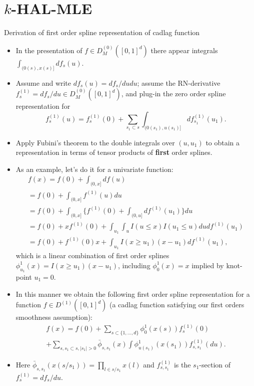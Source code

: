 \documentclass[t]{beamer}
\newlength{\wideitemsep}
\let\olditem\item
\renewcommand{\item}{\setlength{\itemsep}{\wideitemsep}\olditem}
\begin{document}
\section{$k$-HAL-MLE}
\begin{frame}{Derivation of first order spline representation of cadlag function}
\begin{itemize}
\item In the presentation of $f\in D^{(0)}_M([0,1]^d)$ there appear integrals
$\int_{(0(s),x(s)]} df_s(u)$.
\item Assume and write $df_s(u)=df_s/du du$; assume the RN-derivative $f_s^{(1)}=df_s/du\in D^{(0)}_M([0,1]^d)$, and plug-in the zero order spline representation for  \[
f_s^{(1)}(u)=f_s^{(1)}(0)+\sum_{s_1\subset s}\int_{(0(s_1),u(s_1)]} df_{s_1}^{(1)}(u_1).
\]
\item Apply Fubini's theorem to the double integrals over $(u,u_1)$ to obtain a representation in terms of tensor products of {\bf first} order splines.
\end{itemize}
\end{frame}
\begin{frame}
\begin{itemize}
\item As an example, let's do it for a univariate function:
\[
\begin{array}{l}
f(x)=f(0)+\int_{(0,x]} df(u)\\
= f(0)+\int_{(0,x]} f^{(1)}(u) du\\
=f(0)+\int_{(0,x]} \{f^{(1)}(0)+\int_{(0,u]} df^{(1)}(u_1)\} du\\
= f(0)+x f^{(1)}(0)+\int_{u_1}\int_u I(u\leq x) I(u_1\leq u) du df^{(1)}(u_1)\\
=f(0)+f^{(1)}(0) x+\int_{u_1} I(x\geq u_1)(x-u_1) df^{(1)}(u_1),
\end{array}
\]
which is a linear combination of first order splines $\phi^1_{u_1}(x)=I(x\geq u_1)(x-u_1)$, including $\phi^1_0(x)=x$ implied by knot-point $u_1=0$.
\end{itemize}
\end{frame}
\begin{frame}
\begin{itemize}
\item In this manner we obtain the following first order spline representation for a function
$f\in D^{(1)}([0,1]^d)$ (a cadlag function satisfying our first orders smoothness assumption):
\[
\begin{array}{l}
f(x)=f(0)+\sum_{s\subset \{1,\ldots,d\}} \phi^1_0(x(s))f^{(1)}_s(0)\\
+
\sum_{s,s_1\subset s, \mid s_1\mid>0}\bar{\phi}_{s,s_1}(x)\int \phi^1_{u(s_1)}(x(s_1)) f^{(1)}_{s,s_1}(du).\end{array}
\]
\item Here $\bar{\phi}_{s,s_1}(x(s/s_1))=\prod_{l\in s/s_1}x(l)$ and $f^{(1)}_{s,s_1}$ is the $s_1$-section of $f^{(1)}_s=df_s/du$.
\end{itemize}
\end{frame}
\end{document}
